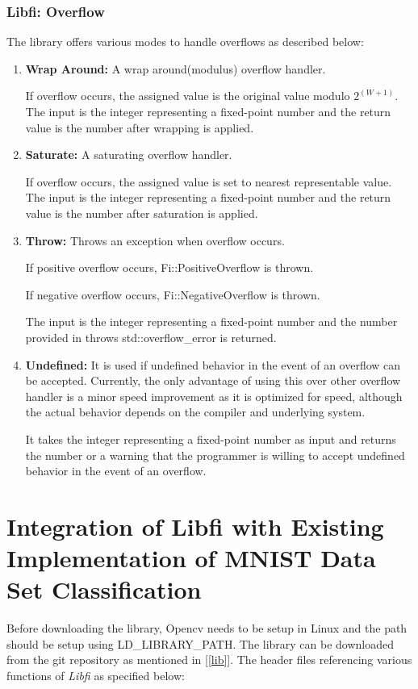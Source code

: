 \subsubsection{Libfi: Overflow}\label{Overflow Section}
The library offers various modes to handle overflows as described below:
\begin{enumerate}
\item
\textbf{Wrap Around:} A wrap around(modulus) overflow handler. 

\noindent If overflow occurs, the assigned value is the original value modulo $2^{(W+1)}$.
The input is the integer representing a fixed-point number and the return value is the number after wrapping is applied.
\item
\textbf{Saturate:} A saturating overflow handler.

\noindent If overflow occurs, the assigned value is set to nearest representable value. The input is the integer representing a fixed-point number and the return value is the number after saturation is applied.
\item
\textbf{Throw:} Throws an exception when overflow occurs.

\noindent If positive overflow occurs, Fi::PositiveOverflow is thrown.

\noindent If negative overflow occurs, Fi::NegativeOverflow is thrown.

\noindent The input is the integer representing a fixed-point number and the number provided in throws std::overflow\_error is returned.
\item
\textbf{Undefined:} It is used if undefined behavior in the event of an overflow can be accepted. Currently, the only advantage of using this over other overflow handler is a minor speed improvement as it is optimized for speed, although the actual behavior depends on the compiler and underlying system.

\noindent It takes the integer representing a fixed-point number as input and returns the number or a warning that the programmer is willing to accept undefined behavior in the event of an overflow.
\end{enumerate}

\section{Integration of Libfi with Existing Implementation of MNIST Data Set Classification}
Before downloading the library, Opencv needs to be setup in Linux and the path should be setup using LD\_LIBRARY\_PATH.
The library can be downloaded from the git repository as mentioned in [\ref{lib}]. The header files referencing various functions of \textit{Libfi} as specified below:

